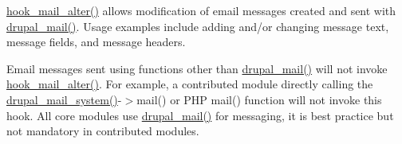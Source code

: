 \hyperlink{group__hooks_gaad1d55a8e7b359933f462a9ca5b2ede0}{hook\_\-mail\_\-alter()} allows modification of email messages created and sent with \hyperlink{mail_8inc_ab80781fd7273975a77cbbd13300eddbf}{drupal\_\-mail()}. Usage examples include adding and/or changing message text, message fields, and message headers.

Email messages sent using functions other than \hyperlink{mail_8inc_ab80781fd7273975a77cbbd13300eddbf}{drupal\_\-mail()} will not invoke \hyperlink{group__hooks_gaad1d55a8e7b359933f462a9ca5b2ede0}{hook\_\-mail\_\-alter()}. For example, a contributed module directly calling the \hyperlink{mail_8inc_a6ba240b2e368447935c9bcb114f59a1a}{drupal\_\-mail\_\-system()}-\/$>$mail() or PHP mail() function will not invoke this hook. All core modules use \hyperlink{mail_8inc_ab80781fd7273975a77cbbd13300eddbf}{drupal\_\-mail()} for messaging, it is best practice but not mandatory in contributed modules.



